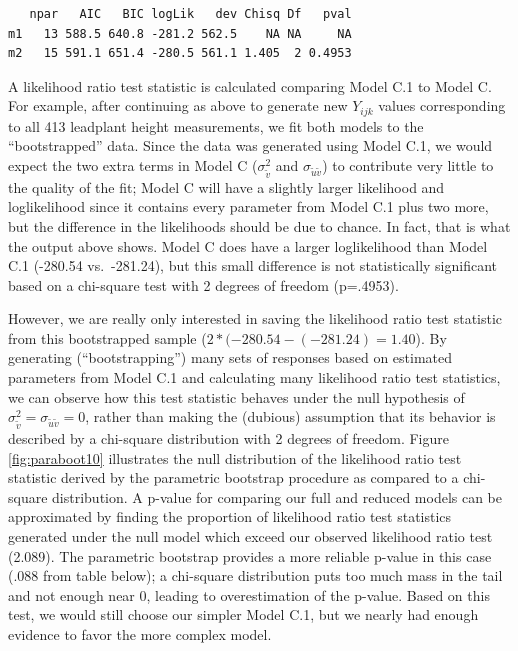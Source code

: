 \documentclass[
]{krantz}
\begin{document}
\begin{verbatim}
   npar   AIC   BIC logLik   dev Chisq Df   pval
m1   13 588.5 640.8 -281.2 562.5    NA NA     NA
m2   15 591.1 651.4 -280.5 561.1 1.405  2 0.4953
\end{verbatim}

A likelihood ratio test statistic is calculated comparing Model C.1 to Model C. For example, after continuing as above to generate new \(Y_{ijk}\) values corresponding to all 413 leadplant height measurements, we fit both models to the ``bootstrapped'' data. Since the data was generated using Model C.1, we would expect the two extra terms in Model C (\(\sigma^2_{\tilde{v}}\) and \(\sigma_{\tilde{u}\tilde{v}}\)) to contribute very little to the quality of the fit; Model C will have a slightly larger likelihood and loglikelihood since it contains every parameter from Model C.1 plus two more, but the difference in the likelihoods should be due to chance. In fact, that is what the output above shows. Model C does have a larger loglikelihood than Model C.1 (-280.54 vs.~-281.24), but this small difference is not statistically significant based on a chi-square test with 2 degrees of freedom (p=.4953).

However, we are really only interested in saving the likelihood ratio test statistic from this bootstrapped sample (\(2*(-280.54 - (-281.24) = 1.40\)). By generating (``bootstrapping'') many sets of responses based on estimated parameters from Model C.1 and calculating many likelihood ratio test statistics, we can observe how this test statistic behaves under the null hypothesis of \(\sigma_{\tilde{v}}^{2} = \sigma_{\tilde{u}\tilde{v}} = 0\), rather than making the (dubious) assumption that its behavior is described by a chi-square distribution with 2 degrees of freedom. Figure \ref{fig:paraboot10} illustrates the null distribution of the likelihood ratio test statistic derived by the parametric bootstrap procedure as compared to a chi-square distribution. A p-value for comparing our full and reduced models can be approximated by finding the proportion of likelihood ratio test statistics generated under the null model which exceed our observed likelihood ratio test (2.089). The parametric bootstrap provides a more reliable p-value in this case (.088 from table below); a chi-square distribution puts too much mass in the tail and not enough near 0, leading to overestimation of the p-value. Based on this test, we would still choose our simpler Model C.1, but we nearly had enough evidence to favor the more complex model.
\end{document}
